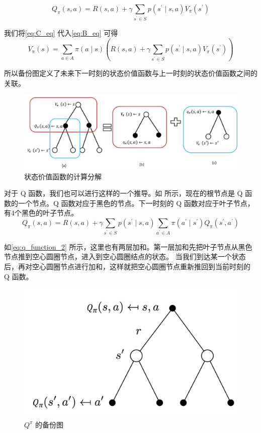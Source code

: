 \begin{equation}
  Q_{\pi}(s,a)=R(s, a)+\gamma \sum_{s^{\prime} \in S} p\left(s^{\prime} \mid s, a\right) V_{\pi}\left(s^{\prime}\right) 
  \label{eq:C_eq}
\end{equation}


我们将\eqref{eq:C_eq} 代入\eqref{eq:B_eq} 可得
\begin{equation}
  V_{\pi}(s)=\sum_{a \in A} \pi(a \mid s)\left(R(s, a)+\gamma \sum_{s^{\prime} \in S} p\left(s^{\prime} \mid s, a\right) V_{\pi}\left(s^{\prime}\right)\right)
  \label{eq:}
\end{equation}

所以备份图定义了未来下一时刻的状态价值函数与上一时刻的状态价值函数之间的关联。

\begin{figure}[hbt]
  \centering
  \includegraphics[width=0.7\linewidth]{res/ch2/state_value_function_backup.png}
  \caption{状态价值函数的计算分解}
  \label{fig:state_value_function_backup}
\end{figure}

对于 Q 函数，我们也可以进行这样的一个推导。如 所示，现在的根节点是 Q 函数的一个节点。Q 函数对应于黑色的节点。下一时刻的 Q 函数对应于叶子节点，有4个黑色的叶子节点。
\begin{equation}
  Q_{\pi}(s, a)=R(s, a)+\gamma \sum_{s^{\prime} \in S} p\left(s^{\prime} \mid s, a\right) \sum_{a^{\prime} \in A} \pi\left(a^{\prime} \mid s^{\prime}\right) Q_{\pi}\left(s^{\prime}, a^{\prime}\right) 
  \label{eq:q_function_2}
\end{equation}

如\eqref{eq:q_function_2} 所示，这里也有两层加和。第一层加和先把叶子节点从黑色节点推到空心圆圈节点，进入到空心圆圈结点的状态。
当我们到达某一个状态后，再对空心圆圈节点进行加和，这样就把空心圆圈节点重新推回到当前时刻的 Q 函数。

\begin{figure}[hbt]
  \centering
  \includegraphics[width=0.5\linewidth]{res/ch2/2.26}
  \caption{$Q^{\pi}$ 的备份图}
  \label{fig:fig2.26}
\end{figure}

